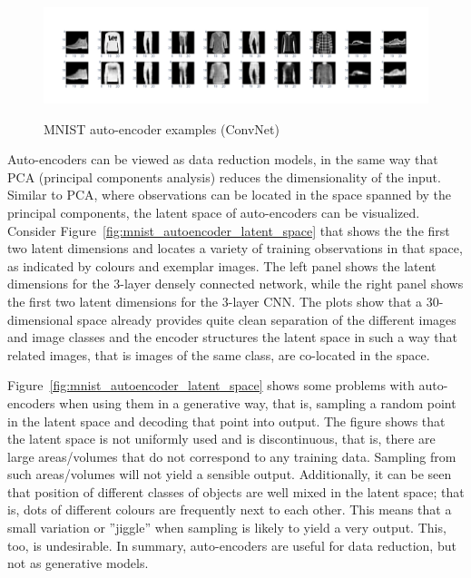 \begin{figure}
\begin{center}
\includegraphics[width=\textwidth]{autoencoder_sample_cnn.png} \\

\caption{MNIST auto-encoder examples (ConvNet)}
\label{fig:mnist_autoencoder_cnn}
\end{center}
\end{figure}

Auto-encoders can be viewed as data reduction models, in the same way that PCA (principal components analysis) reduces the dimensionality of the input. Similar to PCA, where observations can be located in the space spanned by the principal components, the latent space of auto-encoders can be visualized. Consider Figure~\ref{fig:mnist_autoencoder_latent_space} that shows the the first two latent dimensions and locates a variety of training observations in that space, as indicated by colours and exemplar images. The left panel shows the latent dimensions for the 3-layer densely connected network, while the right panel shows the first two latent dimensions for the 3-layer CNN. The plots show that a 30-dimensional space already provides quite clean separation of the different images and image classes and the encoder structures the latent space in such a way that related images, that is images of the same class, are co-located in the space.

Figure~\ref{fig:mnist_autoencoder_latent_space} shows some problems with auto-encoders when using them in a generative way, that is, sampling a random point in the latent space and decoding that point into output. The figure shows that the latent space is not uniformly used and is discontinuous, that is, there are large areas/volumes that do not correspond to any training data. Sampling from such areas/volumes will not yield a sensible output. Additionally, it can be seen that position of different classes of objects are well mixed in the latent space; that is, dots of different colours are frequently next to each other. This means that a small variation or ''jiggle'' when sampling is likely to yield a very output. This, too, is undesirable. In summary, auto-encoders are useful for data reduction, but not as generative models.

